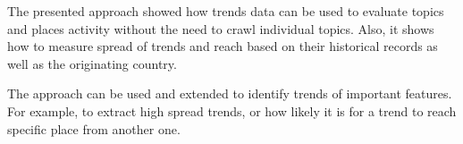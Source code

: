\documentclass{llncs}
\begin{document}
The presented approach showed how trends data can be used to evaluate
topics and places activity without the need to crawl individual
topics. Also, it shows how to measure spread of trends and reach based
on their historical records as well as the originating country.
 
The approach can be used and extended to identify trends of important
features. For example, to extract high spread trends, or how likely it
is for a trend to reach specific place from another one. 






\end{document}
